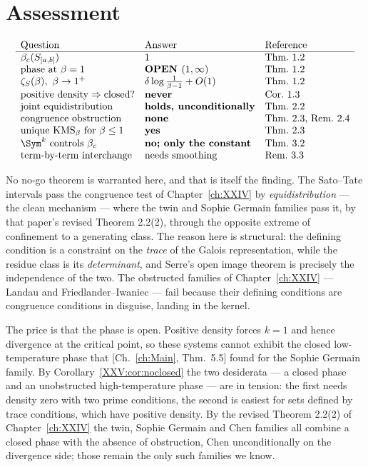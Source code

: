 \section{Assessment}

\[
\begin{array}{lll}
\text{Question} & \text{Answer} & \text{Reference}\\\hline
\beta_c(S_{[a,b]}) & 1 & \text{Thm.~1.2}\\
\text{phase at }\beta=1 & \textbf{OPEN }(1,\infty) & \text{Thm.~1.2}\\
\zeta_S(\beta),\ \beta\to1^+ & \delta\log\frac{1}{\beta-1}+O(1) & \text{Thm.~1.2}\\
\text{positive density}\Rightarrow\text{closed?} & \textbf{never} & \text{Cor.~1.3}\\
\text{joint equidistribution} & \textbf{holds, unconditionally} & \text{Thm.~2.2}\\
\text{congruence obstruction} & \textbf{none} & \text{Thm.~2.3, Rem.~2.4}\\
\text{unique }\mathrm{KMS}_\beta\text{ for }\beta\le1 & \textbf{yes} & \text{Thm.~2.3}\\
\Sym^k\ \text{controls }\beta_c & \textbf{no; only the constant} & \text{Thm.~3.2}\\
\text{term-by-term interchange} & \text{needs smoothing} & \text{Rem.~3.3}
\end{array}
\]

No no-go theorem is warranted here, and that is itself the finding. The Sato--Tate
intervals pass the congruence test of Chapter~\ref{ch:XXIV} by \emph{equidistribution} --- the clean
mechanism --- where the twin and Sophie Germain families pass it, by that paper's revised
Theorem 2.2(2), through the opposite extreme of confinement to a generating class. The
reason here is structural: the defining condition is a
constraint on the \emph{trace} of the Galois representation, while the residue class is its
\emph{determinant}, and Serre's open image theorem \cite{Serre} is precisely the independence of the two.
The obstructed families of Chapter~\ref{ch:XXIV} --- Landau and Friedlander--Iwaniec --- fail because
their defining conditions are congruence conditions in disguise, landing in the kernel.

The price is that the phase is open. Positive density forces $k=1$ and hence divergence at the
critical point, so these systems cannot exhibit the closed low-temperature phase that
[Ch.~\ref{ch:Main}, Thm.~5.5] found for the Sophie Germain family. By Corollary~\ref{XXV:cor:noclosed} the
two desiderata --- a closed phase and an unobstructed high-temperature phase --- are in
tension: the first needs density zero with two prime conditions, the second is easiest for
sets defined by trace conditions, which have positive density. By the revised Theorem 2.2(2) of Chapter~\ref{ch:XXIV} the twin, Sophie Germain and Chen families all
combine a closed phase with the absence of obstruction, Chen unconditionally on the
divergence side; those remain the only such families we know.

